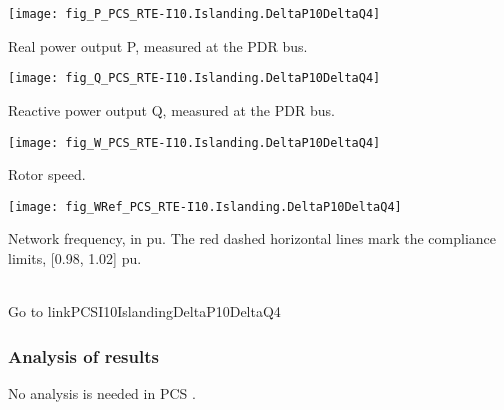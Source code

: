     \vspace{0.5cm}

    \noindent
    \begin{minipage}[t]{0.48\textwidth}
        \centering
        \texttt{[image: fig\_P\_PCS\_RTE-I10.Islanding.DeltaP10DeltaQ4]}
        \begin{minipage}[t]{0.8\textwidth}
            \small Real power output P, measured at the PDR bus.
        \end{minipage}
    \end{minipage}
    \hfill
    \begin{minipage}[t]{0.48\textwidth}
        \centering
        \texttt{[image: fig\_Q\_PCS\_RTE-I10.Islanding.DeltaP10DeltaQ4]}
        \begin{minipage}[t]{0.8\textwidth}
            \small Reactive power output Q, measured at the PDR bus.
        \end{minipage}
    \end{minipage}

    \vspace{0.5cm}

    \noindent
    \begin{minipage}[t]{0.48\textwidth}
        \centering
        \texttt{[image: fig\_W\_PCS\_RTE-I10.Islanding.DeltaP10DeltaQ4]}
        \begin{minipage}[t]{0.8\textwidth}
            \small Rotor speed.
        \end{minipage}
    \end{minipage}
    \hfill
    \begin{minipage}[t]{0.48\textwidth}
        \centering
        \texttt{[image: fig\_WRef\_PCS\_RTE-I10.Islanding.DeltaP10DeltaQ4]}
        \begin{minipage}[t]{0.8\textwidth}
            \small Network frequency, in pu. The red dashed horizontal lines mark
            the compliance limits, [0.98, 1.02] pu.
        \end{minipage}
    \end{minipage}
    \\[2\baselineskip]
    Go to  {{ linkPCSI10IslandingDeltaP10DeltaQ4 }}


    \subsubsection{Analysis of results}

    \noindent No analysis is needed in PCS \DTRPcs.


